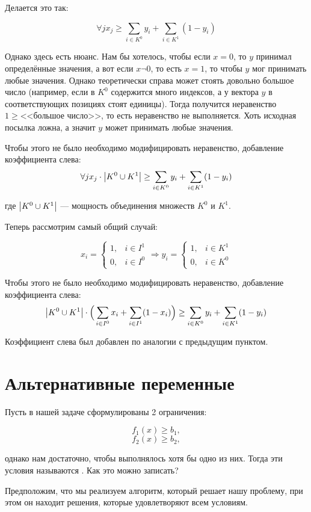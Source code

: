 Делается это так:

\[
	\forall j x_j \ge \sum_{i \in K^0} y_i + \sum_{i \in K^1} (1-y_i)
\]

Однако здесь есть нюанс. Нам бы хотелось, чтобы если $x = 0$, то $y$ принимал определённые значения, а вот если $x \neg 0$, то есть $x = 1$, то чтобы $y$ мог принимать любые значения. Однако теоретически справа может стоять довольно большое число (например, если в $K^0$ содержится много индексов, а у вектора $y$ в соответствующих позициях стоят единицы). Тогда получится неравенство $1 \ge \text{<<большое число>>}$, то есть неравенство не выполняется. Хоть исходная посылка ложна, а значит $y$ может принимать любые значения.

Чтобы этого не было необходимо модифицировать неравенство, добавление коэффициента слева:
\[
	\forall j x_j \cdot \abs{K^0 \cup K^1} \ge \sum_{i \in K^0} y_i + \sum_{i \in K^1} (1-y_i)
\]

где $\abs{K^0 \cup K^1}$ --- мощность объединения множеств $K^0$ и $K^1$.


Теперь рассмотрим самый общий случай:

\[
	x_i = \begin{cases}
		1,& i \in I^1 \\
		0,& i \in I^0
	\end{cases}
	\Rightarrow
	y_i = \begin{cases}
		1,& i \in K^1 \\
		0,& i \in K^0
	\end{cases}
\]


Чтобы этого не было необходимо модифицировать неравенство, добавление коэффициента слева:
\[
\abs{K^0 \cup K^1} \cdot \Big(\sum_{i \in I^0} x_i + \sum_{i \in I^1} (1-x_i)\Big) \ge \sum_{i \in K^0} y_i + \sum_{i \in K^1} (1-y_i)
\]

Коэффициент слева был добавлен по аналогии с предыдущим пунктом.

\section{Альтернативные переменные}

Пусть в нашей задаче сформулированы 2 ограничения:

\[f_1(x) \ge b_1,\]
\[f_2(x) \ge b_2,\]

однако нам достаточно, чтобы выполнялось хотя бы одно из них. Тогда эти условия называются . Как это можно записать?

Предположим, что мы реализуем алгоритм, который решает нашу проблему, при этом он находит решения, которые удовлетворяют всем условиям.  

